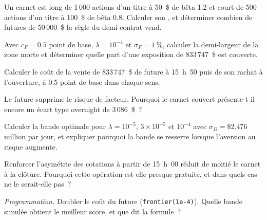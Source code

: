 \begin{exercise}[$\star$]\label{exo:hf:hedging-and-inventory-in-practice:1}
Un carnet est long de 1\,000 actions d'un titre à 50~\$ de bêta 1.2 et court de 500 actions d'un titre à 100~\$ de bêta 0.8. Calculer son ,
et déterminer combien de futures de 50\,000~\$ la règle du demi-contrat vend.
\end{exercise}

\begin{exercise}[$\star$]\label{exo:hf:hedging-and-inventory-in-practice:2}
Avec $c_F=0.5$ point de base, $\lambda=10^{-4}$ et $\sigma_F=1~\%$, calculer la demi-largeur de la zone morte et déterminer quelle part d'une exposition de 833\,747~\$ est couverte.
\end{exercise}

\begin{exercise}[$\star$]\label{exo:hf:hedging-and-inventory-in-practice:3}
Calculer le coût de la vente de 833\,747~\$ de future à 15~h~50 puis de son rachat à l'ouverture, à 0.5 point de base dans chaque sens.
\end{exercise}

\begin{exercise}[$\star\star$]\label{exo:hf:hedging-and-inventory-in-practice:4}
Le future supprime le risque de facteur. Pourquoi le carnet couvert présente-t-il encore un écart type overnight de 3\,086~\$~?
\end{exercise}

\begin{exercise}[$\star\star$]\label{exo:hf:hedging-and-inventory-in-practice:5}
Calculer la bande optimale pour $\lambda=10^{-5}$, $3\times10^{-5}$ et $10^{-4}$ avec $\sigma_D=\$2.476$ million par jour, et expliquer pourquoi la bande
se resserre lorsque l'aversion au risque augmente.
\end{exercise}

\begin{exercise}[$\star\star$]\label{exo:hf:hedging-and-inventory-in-practice:6}
Renforcer l'asymétrie des cotations à partir de 15~h~00 réduit de moitié le carnet à la clôture. Pourquoi cette opération est-elle presque gratuite, et dans quels cas ne le serait-elle pas~?
\end{exercise}

\begin{exercise}[$\star\star\star$]\label{exo:hf:hedging-and-inventory-in-practice:7}
\emph{Programmation.} Doubler le coût du future (\texttt{frontier(1e-4)}). Quelle bande simulée obtient le meilleur score, et que dit la formule~?
\end{exercise}

